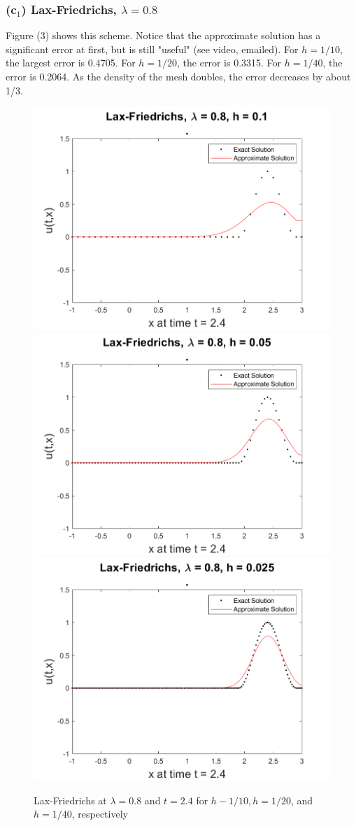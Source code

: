 \documentclass[12pt]{article}
\begin{document}
\subsubsection*{(c$_1$) Lax-Friedrichs, $\lambda = 0.8$}
\vspace{-1mm}
Figure (3) shows this scheme. Notice that the approximate solution has a significant error at first, but is still "useful" (see video, emailed). For $h=1/10$, the largest error is 0.4705. For $h=1/20$, the error is 0.3315. For $h=1/40$, the error is 0.2064. As the density of the mesh doubles, the error decreases by about 1/3.

\begin{figure}
	\centering
	\includegraphics[width=.6\linewidth]{./code/c_lax_friedrichs_1_10th.png}	\includegraphics[width=.6\linewidth]{./code/c_lax_friedrichs_1_20th.png}
	\includegraphics[width=.6\linewidth]{./code/c_lax_friedrichs_1_40th.png}
	\caption{Lax-Friedrichs at $\lambda = 0.8$ and $t=2.4$ for $h-1/10, h=1/20$, and $h=1/40$, respectively}
\end{figure}
\end{document}
